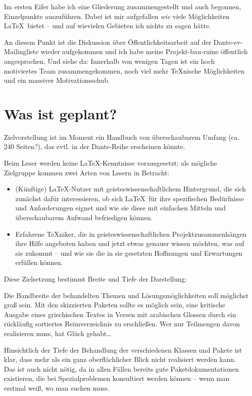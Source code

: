 \documentclass[ngerman]{dtk}
\begin{document}
Im ersten Eifer habe ich eine Gliederung zusammengestellt und auch begonnen, Einzelpunkte auszuführen.
Dabei ist mir aufgefallen \emph{wie} viele Möglichkeiten \LaTeX\ bietet -- und auf wievielen Gebieten ich nichts
zu sagen hätte.

An diesem Punkt ist die Diskussion über Öffentlichkeitsarbeit auf der Dante-ev-Mailingliste wieder aufgekommen
und ich habe meine Projekt-bau-ruine öffentlich angesprochen. Und siehe da: Innerhalb von wenigen Tagen
ist ein hoch motiviertes Team zusammengekommen, noch viel mehr \TeX nische Möglichkeiten und ein
massiver Motivationsschub.


\section{Was ist geplant?}

Zielvorstellung ist im Moment ein Handbuch von überschaubarem Umfang (ca. 240 Seiten?), das evtl. in der 
Dante-Reihe erscheinen könnte.

Beim Leser werden keine \LaTeX -Kenntnisse vorausgesetzt; als mögliche Zielgruppe kommen zwei Arten von Lesern
in Betracht:

\begin{itemize}
    \item (Künftige) \LaTeX -Nutzer mit geisteswissenschaftlichem Hintergrund, die sich zunächst dafür
         interessieren, ob sich \LaTeX\ für ihre spezifischen Bedürfnisse und Anforderungen eignet und
         wie sie diese mit einfachen Mitteln und überschaubarem Aufwand befriedigen können.
    \item Erfahrene \TeX niker, die in geisteswissenschaftlichen Projektzusammenhängen ihre Hilfe angeboten
         haben und jetzt etwas genauer wissen möchten, was auf sie zukommt -- und wie sie die in sie
         gesetzten Hoffnungen und Erwartungen erfüllen können.
\end{itemize}

Diese Zielsetzung bestimmt Breite und Tiefe der Darstellung: 

Die Bandbreite der behandelten Themen und Lösungsmöglichkeiten soll möglichst groß sein.
Mit den skizzierten Paketen sollte es möglich sein, eine kritische Ausgabe eines griechischen Textes in Versen mit
arabischen Glossen durch ein rückläufig sortiertes Reimverzeichnis zu erschließen.
Wer nur Teilmengen davon realisieren muss, hat Glück gehabt\ldots

Hinsichtlich der Tiefe der Behandlung der verschiedenen Klassen und Pakete ist klar, dass mehr als ein
ganz oberflächlicher Blick nicht realisiert werden kann. Das ist auch nicht nötig, da in allen Fällen bereits
gute Paketdokumentationen existieren, die bei Spezialproblemen konsultiert werden können -- wenn man erstmal
weiß, wo man suchen muss.
\end{document}
